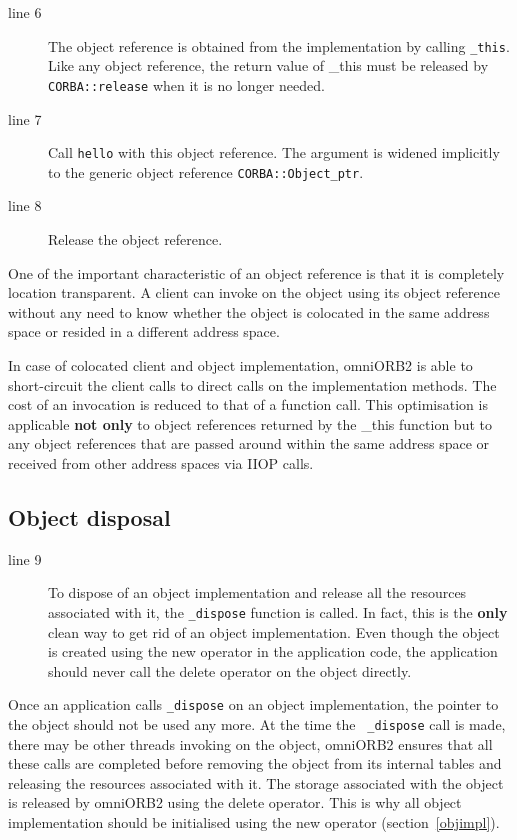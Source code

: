 \documentclass[11pt,twoside,onecolumn]{book}
\begin{document}
\begin{description}

\item[line 6] The object reference is obtained from the implementation by
calling {\tt \_this}. Like any object reference, the return value of \_this
must be released by {\tt CORBA::release} when it is no longer needed.
\item[line 7] Call {\tt hello} with this object reference. The argument is
widened implicitly to the generic object reference {\tt CORBA::Object\_ptr}.
\item[line 8] Release the object reference.
\end{description}

One of the important characteristic of an object reference is that it is
completely location transparent. A client can invoke on the object using
its object reference without any need to know whether the object is
colocated in the same address space or resided in a different address
space. 

In case of colocated client and object implementation, omniORB2 is able to
short-circuit the client calls to direct calls on the
implementation methods. The cost of an invocation is reduced to that of a
function call. This optimisation is applicable {\bf not only} to object
references returned by the \_this function but to any object references
that are passed around within the same address space or received from other
address spaces via IIOP calls.

\subsection{Object disposal}

\begin{description}

\item[line 9] To dispose of an object implementation and release all the
resources associated with it, the {\tt \_dispose} function is called.  In
fact, this is the {\bf only} clean way to get rid of an object
implementation. Even though the object is created using the new operator in
the application code, the application should never call the delete operator
on the object directly.

\end{description}

Once an application calls {\tt \_dispose} on an object implementation, the
pointer to the object should not be used any more. At the time the {\tt
\_dispose} call is made, there may be other threads invoking on the object,
omniORB2 ensures that all these calls are completed before removing the
object from its internal tables and releasing the resources associated with
it. The storage associated with the object is released by omniORB2
using the delete operator. This is why all object implementation should be
initialised using the new operator (section~\ref{objimpl}).
\end{document}

